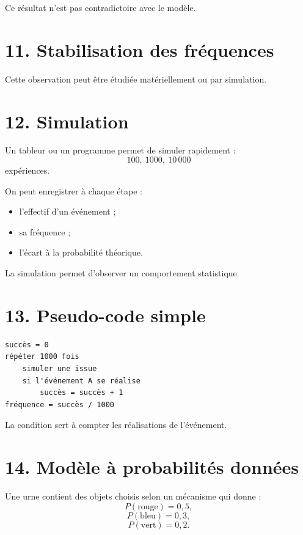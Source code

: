 Ce résultat n'est pas contradictoire avec le modèle.

\section{11. Stabilisation des fréquences}


Cette observation peut être étudiée matériellement ou par simulation.

\section{12. Simulation}

Un tableur ou un programme permet de simuler rapidement :
\[
100,\ 1000,\ 10\,000
\]
expériences.

On peut enregistrer à chaque étape :
\begin{itemize}
\item l'effectif d'un événement ;
\item sa fréquence ;
\item l'écart à la probabilité théorique.
\end{itemize}

La simulation permet d'observer un comportement statistique.

\section{13. Pseudo-code simple}

\begin{verbatim}
succès = 0
répéter 1000 fois
    simuler une issue
    si l'événement A se réalise
        succès = succès + 1
fréquence = succès / 1000
\end{verbatim}

La condition sert à compter les réalisations de l'événement.

\section{14. Modèle à probabilités données}

Une urne contient des objets choisis selon un mécanisme qui donne :
\[
P(\text{rouge})=0{,}5,
\]
\[
P(\text{bleu})=0{,}3,
\]
\[
P(\text{vert})=0{,}2.
\]

